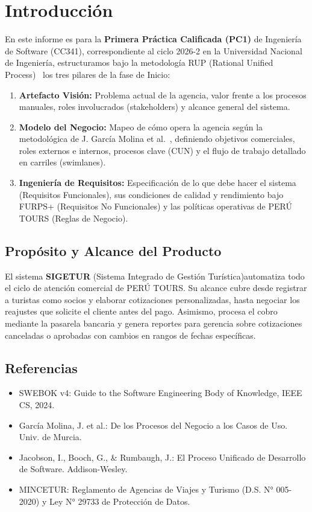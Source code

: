 \section{Introducción}
En este informe es para la \textbf{Primera Práctica Calificada (PC1)} de Ingeniería de Software (CC341), correspondiente al ciclo 2026-2 en la Universidad Nacional de Ingeniería, estructuramos bajo la metodología RUP (Rational Unified Process)~\cite{rup2000} %
los tres pilares de la fase de Inicio:

\begin{enumerate}
    \item \textbf{Artefacto Visión:} Problema actual de la agencia, valor frente a los procesos manuales, roles involucrados (stakeholders) y alcance general del sistema.
    \item \textbf{Modelo del Negocio:} Mapeo de cómo opera la agencia según la metodológica de J. García Molina et al.~\cite{garciamolina}, %
    definiendo objetivos comerciales, roles externos e internos, procesos clave (CUN) y el flujo de trabajo detallado en carriles (swimlanes).
    \item \textbf{Ingeniería de Requisitos:} Especificación de lo que debe hacer el sistema (Requisitos Funcionales), sus condiciones de calidad y rendimiento bajo FURPS+ (Requisitos No Funcionales) y las políticas operativas de PERÚ TOURS (Reglas de Negocio).
\end{enumerate}

\subsection{Propósito y Alcance del Producto}
El sistema \textbf{SIGETUR} (Sistema Integrado de Gestión Turística)automatiza todo el ciclo de atención comercial de PERÚ TOURS. Su alcance cubre desde registrar a turistas como socios y elaborar cotizaciones personalizadas, hasta negociar los reajustes que solicite el cliente antes del pago. Asimismo, procesa el cobro mediante la pasarela bancaria y genera reportes para gerencia sobre cotizaciones canceladas o aprobadas con cambios en rangos de fechas específicas.

\subsection{Referencias}
\begin{itemize}[noitemsep]
    \item SWEBOK v4: Guide to the Software Engineering Body of Knowledge, IEEE CS, 2024.
    \item García Molina, J. et al.: De los Procesos del Negocio a los Casos de Uso. Univ. de Murcia.
    \item Jacobson, I., Booch, G., \& Rumbaugh, J.: El Proceso Unificado de Desarrollo de Software. Addison-Wesley.
    \item MINCETUR: Reglamento de Agencias de Viajes y Turismo (D.S. N° 005-2020) y Ley N° 29733 de Protección de Datos.
\end{itemize}
